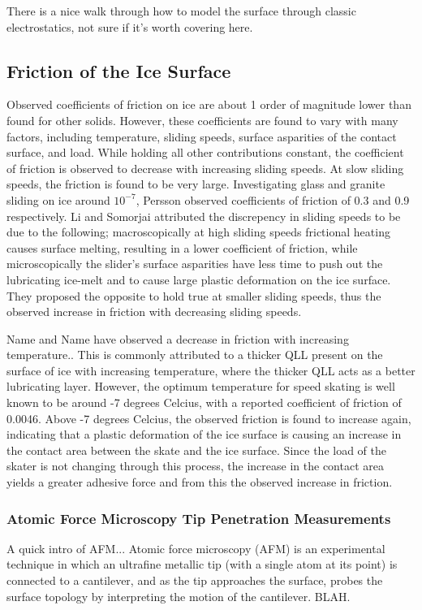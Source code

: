 There is a nice walk through how to model the surface through classic
electrostatics, not sure if it's worth covering here.



\subsection{Friction of the Ice Surface}
Observed coefficients of friction on ice are about 1 order of
magnitude lower than found for other solids. However, these
coefficients are found to vary with many factors, including
temperature, sliding speeds, surface asparities of the contact
surface, and load.\cite{Evans1976,Kietzig2002,Persson2001,Persson2015} While
holding all other contributions constant, the coefficient of friction
is observed to decrease with increasing sliding speeds. At slow
sliding speeds, the friction is found to be very large. Investigating
glass and granite sliding on ice around $10^{-7}$, Persson observed
coefficients of friction of 0.3 and 0.9 respectively.\cite{Persson2000} Li and
Somorjai attributed the discrepency in sliding speeds to be due to the
following; macroscopically at high sliding speeds frictional heating
causes surface melting, resulting in a lower coefficient of friction,
while microscopically the slider's surface asparities have less time
to push out the lubricating ice-melt and to cause large plastic
deformation on the ice surface.\cite{Li2007} They proposed the
opposite to hold true at smaller sliding speeds, thus the observed
increase in friction with decreasing sliding speeds.

Name and Name have observed a decrease in friction with increasing
temperature.\cite{Evans1976,Colbeck1997}. This is commonly attributed to a
thicker QLL present on the surface of ice with increasing temperature,
where the thicker QLL acts as a better lubricating layer. However, the
optimum temperature for speed skating is well known to be around -7
degrees Celcius, with a reported coefficient of friction of
0.0046.\cite{Dekoning1992} Above -7 degrees Celcius, the observed
friction is found to increase again, indicating that a plastic
deformation of the ice surface is causing an increase in the contact
area between the skate and the ice surface.\cite{Barnes1966,Barnes1971}
Since the load of the skater is not changing through this process, the
increase in the contact area yields a greater adhesive force and from
this the observed increase in friction.

\subsubsection{Atomic Force Microscopy Tip Penetration Measurements}
A quick intro of AFM...  Atomic force microscopy (AFM) is an
experimental technique in which an ultrafine metallic tip (with a
single atom at its point) is connected to a cantilever, and as the tip
approaches the surface, probes the surface topology by interpreting
the motion of the cantilever. BLAH. 

